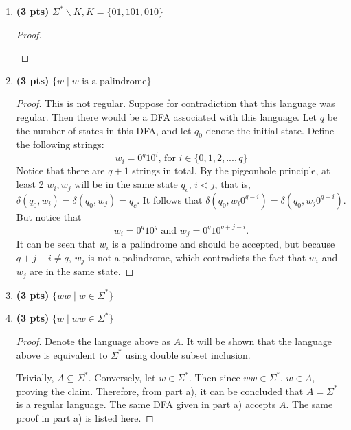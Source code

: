 \documentclass[11pt]{article}
\begin{document}
\begin{enumerate}[label=\textbf{Q\arabic*.}]
\begin{enumerate}[label=\textit{\alph*)}]
\begin{proof}
		A string that is not in \(\Sigma ^*\) cannot be found so the backwards direction is vacuously true.

		Therefore \(\mathcal{D}\) is correct.
		\smallbreak
	\end{proof}

	\item \textbf{(3 pts)} $ \Sigma^*\backslash K, K =\{01, 101, 010\}$
	
	\begin{proof}
		\begin{center}
		\end{center}
	\end{proof}
	\item \textbf{(3 pts)} $ \{w \mid w \text{ is a palindrome}\} $
	
	\begin{proof}
		This is not regular. Suppose for contradiction that this language was regular. Then there would be a DFA associated with this language. Let \(q\) be the number of states in this DFA, and let \(q_0\) denote the initial state. Define the following strings:
		\[
			w_i = 0^q 1 0^{i} \text{, for } i \in \{0, 1, 2, ..., q\}
		\]
		Notice that there are \(q+1\) strings in total. By the pigeonhole principle, at least 2 \(w_i, w_j\) will be in the same state \(q_c\), \(i < j\), that is, \(\delta (q_0, w_i) = \delta (q_0, w_j) = q_c\). It follows that \(\delta (q_0, w_i 0^{q-i}) = \delta (q_0, w_j 0^{q-i})\). But notice that
		\[
			w_i = 0^q 1 0^q \text{ and } w_j = 0^q 1 0^{q+j-i} \text{.} 
		\]
		It can be seen that \(w_i\) is a palindrome and should be accepted, but because \(q + j - i \neq q\), \(w_j\) is not a palindrome, which contradicts the fact that \(w_i\) and \(w_j\) are in the same state.

	\end{proof}
	\item \textbf{(3 pts)} $ \{ww \mid w \in \Sigma^*  \} $
	\item \textbf{(3 pts)} $ \{w \mid ww \in \Sigma^*  \} $

	\begin{proof}
		Denote the language above as \(A\). It will be shown that the language above is equivalent to \(\Sigma ^*\) using double subset inclusion.

		Trivially, \(A \subseteq \Sigma ^*\). Conversely, let \(w \in \Sigma ^*\). Then since \(ww \in \Sigma ^*\), \(w \in A\), proving the claim. Therefore, from part a), it can be concluded that \(A = \Sigma ^*\) is a regular language. The same DFA given in part a) accepts \(A\). The same proof in part a) is listed here.


\end{proof}
\end{enumerate}
\end{enumerate}
\end{document}
